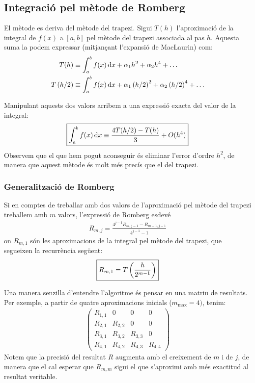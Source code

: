 \subsection{Integració pel mètode de Romberg}
El mètode es deriva del mètode del trapezi. Sigui $T(h)$ l'aproximació de la integral de $f(x)$ a $[a,b]$ pel mètode del trapezi associada al pas $h$. Aquesta suma la podem expressar (mitjançant l'expansió de MacLaurin) com:
\begin{align*}
\begin{aligned}
    T(h) &\equiv \int_{a}^{b} f(x) \mathop{}\!\mathrm{d} x + \alpha_{1}h^{2} + \alpha_{2}h^{4} + \dots \\
    T\left( h/2 \right) &\equiv \int_{a}^{b} f(x) \mathop{}\!\mathrm{d} x + \alpha_{1}\left( h/2 \right)^{2} + \alpha_{2}\left( h/2 \right)^{4} + \dots
\end{aligned}
\end{align*}

Manipulant aquests dos valors arribem a una expressió exacta del valor de la integral:
\begin{align}
    \boxed{\int_{a}^{b} f(x) \mathop{}\!\mathrm{d} x \equiv \frac{4T(h/2) - T(h)}{3} + O(h^{4})}
\end{align}
Observem que el que hem pogut aconseguir és eliminar l'error d'ordre $h^{2}$, de manera que aquest mètode és molt més precís que el del trapezi.

\subsubsection*{Generalització de Romberg}
Si en comptes de treballar amb dos valors de l'aproximació pel mètode del trapezi treballem amb $m$ valors, l'expressió de Romberg esdevé
\begin{align}
    \boxed{R_{m,j} = \frac{4^{j-1} R_{m,j-1} - R_{m-1,j-1}}{4^{j-1} - 1}}
\end{align}
on $R_{m,1}$ són les aproximacions de la integral pel mètode del trapezi, que segueixen la recurrència següent:
\begin{align}
    \boxed{R_{m,1} = T\left( \frac{h}{2^{m-1}} \right)}
\end{align}

Una manera senzilla d'entendre l'algoritme és pensar en una matriu de resultats. Per exemple, a partir de quatre aproximacions inicials ($m_{\max} = 4)$, tenim:
\begin{align*}
    \begin{pmatrix}
        R_{1,1} & 0 & 0 & 0 \\
        R_{2,1} & R_{2,2} & 0 & 0\\
        R_{3,1} & R_{3,2} & R_{3,3} & 0 \\
        R_{4,1} & R_{4,2} & R_{4,3} & R_{4,4} 
    \end{pmatrix}
\end{align*}
Notem que la precisió del resultat $R$ augmenta amb el creixement de $m$ i de $j$, de manera que el cal esperar que $R_{m,m}$ sigui el que s'aproximi amb més exactitud al resultat veritable.

